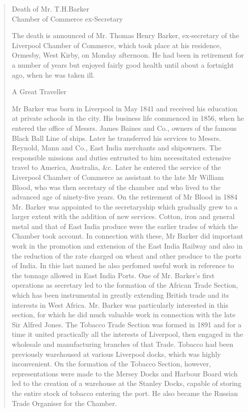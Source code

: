 \begin{quotation}
Death of Mr. T.H.Barker \\
Chamber of Commerce ex-Secretary

The death is announced of Mr. Thomas Henry Barker, ex-secretary of the Liverpool Chamber of Commerce, which took place at his residence, Ormesby, West Kirby, on Monday afternoon. He had been in retirement for a number of years but enjoyed fairly good health until about a fortnight ago, when he was taken ill.

A Great Traveller

Mr Barker was born in Liverpool in May 1841 and received his education at private schools in the city. His business life commenced in 1856, when he entered the office of Messrs. James Baines and Co., owners of the famous Black Ball Line of ships.  Later he transferred his services to Messrs. Reynold, Mann and Co., East India merchants and shipowners.  The responsible missions and duties entrusted to him necessitated extensive travel to America, Australia, \&c.  Later he entered the service of the Liverpool Chamber of Commerce as assistant to the late Mr William Blood, who was then secretary of the chamber and who lived to the advanced age of ninety-five years.  On the retirement of Mr Blood in 1884 Mr. Barker was appointed to the secretaryship which gradually grew to a larger extent with the addition of new services. Cotton, iron and general metal and that of East India produce were the earlier trades of which the Chamber took account.  In connection with these, Mr Barker did important work in the promotion and extension of the East India Railway and also in the reduction of the rate charged on wheat and other produce to the ports of India. In thie last named he also perfomed useful work in reference to the tonnage allowed in East India Ports.
One of Mr. Barker's first operations as secretary led to the formation of the African Trade Section, which has been instrumental in greatly extending British trade and its interests in West Africa. Mr. Barker was particularly interested in this section, for which he did much valuable work in connection with the late Sir Alfred Jones.  The Tobacco Trade Section was formed in 1891 and for a time it united practically all the interests of Liverpool, then engaged in the wholesale and manufacturing branches of that Trade.  Tobacco had been previously warehoused at various Liverpool docks, which was highly inconvenient.  On the formation of the Tobacco Section, however, representations were made to the Mersey Docks and Harbour Board wich led to the creation of a warehouse at the Stanley Docks, capable of storing the entire stock of tobacco entering the port.  He also became the Russian Trade Organiser for the Chamber.


\end{quotation}
